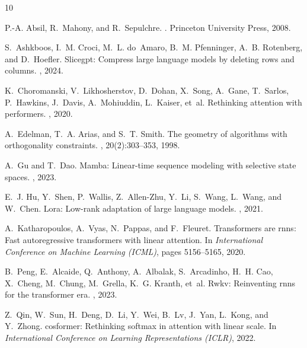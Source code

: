 \documentclass[10pt,twocolumn,letterpaper]{article}
\begin{document}

\begin{thebibliography}{10}

P.-A. Absil, R.~Mahony, and R.~Sepulchre.
.
\newblock Princeton University Press, 2008.

S.~Ashkboos, I.~M. Croci, M.~L. do~Amaro, B.~M. Pfenninger, A.~B. Rotenberg, and D.~Hoefler.
\newblock Slicegpt: Compress large language models by deleting rows and columns.
, 2024.

K.~Choromanski, V.~Likhosherstov, D.~Dohan, X.~Song, A.~Gane, T.~Sarlos, P.~Hawkins, J.~Davis, A.~Mohiuddin, L.~Kaiser, et~al.
\newblock Rethinking attention with performers.
, 2020.

A.~Edelman, T.~A. Arias, and S.~T. Smith.
\newblock The geometry of algorithms with orthogonality constraints.
, 20(2):303--353, 1998.

A.~Gu and T.~Dao.
\newblock Mamba: Linear-time sequence modeling with selective state spaces.
, 2023.

E.~J. Hu, Y.~Shen, P.~Wallis, Z.~Allen-Zhu, Y.~Li, S.~Wang, L.~Wang, and W.~Chen.
\newblock Lora: Low-rank adaptation of large language models.
, 2021.

A.~Katharopoulos, A.~Vyas, N.~Pappas, and F.~Fleuret.
\newblock Transformers are rnns: Fast autoregressive transformers with linear attention.
\newblock In {\em International Conference on Machine Learning (ICML)}, pages 5156--5165, 2020.

B.~Peng, E.~Alcaide, Q.~Anthony, A.~Albalak, S.~Arcadinho, H.~H. Cao, X.~Cheng, M.~Chung, M.~Grella, K.~G. Kranth, et~al.
\newblock Rwkv: Reinventing rnns for the transformer era.
, 2023.

Z.~Qin, W.~Sun, H.~Deng, D.~Li, Y.~Wei, B.~Lv, J.~Yan, L.~Kong, and Y.~Zhong.
\newblock cosformer: Rethinking softmax in attention with linear scale.
\newblock In {\em International Conference on Learning Representations (ICLR)}, 2022.


\end{thebibliography}
\end{document}
